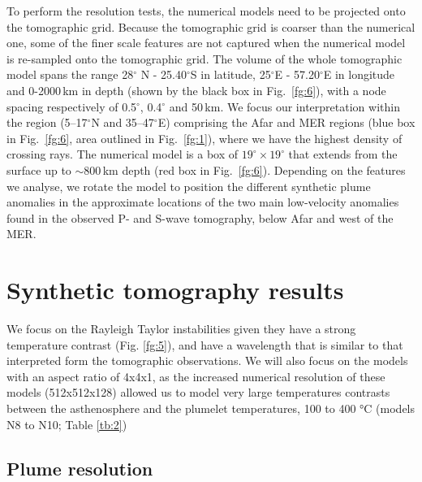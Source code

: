 \documentclass[a4paper,10pt,twocolumn]{paper}
\begin{document}
To perform the resolution tests, the numerical models need to be projected onto the tomographic grid. Because the tomographic grid is coarser than the numerical one, some of the finer scale features are not captured when the numerical model is re-sampled onto the tomographic grid. The volume of the whole tomographic model spans the range 28$^{\circ}$ N - 25.40$^{\circ}$S in latitude, 25$^{\circ}$E - 57.20$^{\circ}$E in longitude and 0-2000\,km in depth (shown by the black box in Fig.~\ref{fg:6}), with a node spacing respectively of 0.5$^{\circ}$, 0.4$^{\circ}$ and 50\,km. We focus our interpretation within the region (5–17$^{\circ}$N and 35–47$^{\circ}$E) comprising the Afar and MER regions (blue box in Fig.~\ref{fg:6}, area outlined in Fig.~\ref{fg:1}), where we have the highest density of crossing rays. The numerical model is a box of $19^{\circ} \times 19^{\circ}$ that extends from the surface up to $\sim800$\,km depth (red box in Fig.~\ref{fg:6}). Depending on the features we analyse, we rotate the model to position the different synthetic plume anomalies in the approximate locations of the two main low-velocity anomalies found in the observed P- and S-wave tomography, below Afar and west of the MER.

\section{Synthetic tomography results}

We focus on the Rayleigh Taylor instabilities given they have a strong temperature contrast (Fig. \ref{fg:5}), and have a wavelength that is similar to that interpreted form the tomographic observations. We will also focus on the models with an aspect ratio of 4x4x1, as the increased numerical resolution of these models (512x512x128) allowed us to model very large temperatures contrasts between the asthenosphere and the plumelet temperatures, 100 to 400 °C (models N8 to N10; Table \ref{tb:2})

\subsection{Plume resolution}
\end{document}
